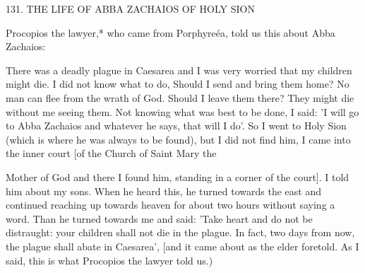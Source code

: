 131. THE LIFE OF ABBA ZACHAIOS OF HOLY SION

Procopios the lawyer,* who came from Porphyreéa, told us this
about Abba Zachaios:

There was a deadly plague in Caesarea and I was very worried that
my children might die. I did not know what to do, Should I send
and bring them home? No man can flee from the wrath of God.
Should I leave them there? They might die without me seeing them.
Not knowing what was best to be done, I said: 'I will go to Abba
Zachaios and whatever he says, that will I do'. So I went to Holy
Sion (which is where he was always to be found), but I did not find
him, I came into the inner court [of the Church of Saint Mary the

Mother of God and there I found him, standing in a corner of the
court]. I told him about my sons. When he heard this, he turned
towards the east and continued reaching up towards heaven for
about two hours without saying a word. Than he turned towards
me and said: 'Take heart and do not be distraught: your children
shall not die in the plague. In fact, two days from now, the plague
shall abate in Caesarea', [and it came about as the elder foretold. As
I said, this is what Procopios the lawyer told us.)

